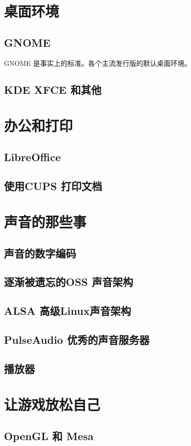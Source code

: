 \documentclass[amstex,twoside]{ctexbook}
\begin{document}
\section{桌面环境}
\subsection{GNOME}
GNOME 是事实上的标准。各个主流发行版的默认桌面环境。
\subsection{ KDE XFCE 和其他}

\section{  办公和打印	}
\subsection{  LibreOffice	}
\subsection{使用CUPS 打印文档	}
\section{ 声音的那些事	}
\subsection{  声音的数字编码	}
\subsection{  逐渐被遗忘的OSS	声音架构}
\subsection{ ALSA 高级Linux声音架构}
\subsection{  PulseAudio 优秀的声音服务器	}
\subsection{  播放器	}
\section{  让游戏放松自己	}
\subsection{  OpenGL 和 Mesa	}
\end{document}

